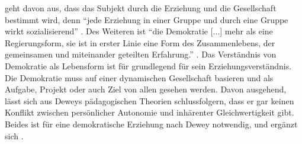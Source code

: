 \citeauthor{Dewey2010} geht davon aus, dass das Subjekt durch die Erziehung und die Gesellschaft bestimmt wird, denn ``jede Erziehung in einer Gruppe und durch eine Gruppe wirkt sozialisierend'' \parencite[115]{Dewey2010}.
Des Weiteren ist ``die Demokratie [...] mehr als eine Regierungsform, sie ist in erster Linie eine Form des Zusammenlebens, der gemeinsamen und miteinander geteilten Erfahrung.'' \parencite[121]{Dewey2010}.
Das Verständnis von Demokratie als Lebensform ist für \citeauthor{Dewey2010} grundlegend für sein Erziehungsverständnis.
Die Demokratie muss auf einer dynamischen Gesellschaft basieren und als Aufgabe, Projekt oder auch Ziel von allen gesehen werden.
Davon ausgehend, lässt sich aus Deweys pädagogischen Theorien schlussfolgern, dass er gar keinen Konflikt zwischen persönlicher Autonomie und inhärenter Gleichwertigkeit gibt.
Beides ist für eine demokratische Erziehung nach Dewey notwendig, und ergänzt sich \parencite[121]{Dewey2010}.
